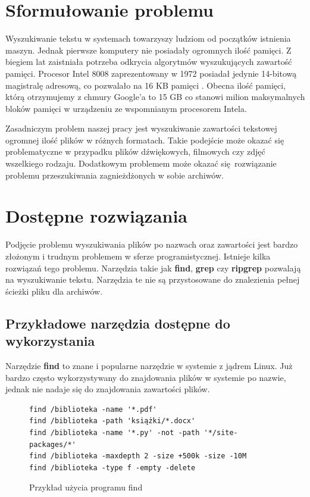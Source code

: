 \section{Sformułowanie problemu}
Wyszukiwanie tekstu w systemach towarzyszy ludziom od początków istnienia maszyn.
Jednak pierwsze komputery nie posiadały ogromnych ilość pamięci. Z biegiem lat
zaistniała potrzeba odkrycia algorytmów wyszukujących zawartość pamięci. 
Procesor Intel 8008 zaprezentowany w 1972 posiadał jedynie 14-bitową magistralę
adresową, co pozwalało na 16 KB pamięci \cite{bib:internet:Intel8008}. 
Obecna ilość pamięci, którą otrzymujemy z chmury Google'a to 15 GB
\cite{bib:internet:GoogleCloud} co stanowi milion maksymalnych bloków pamięci w 
urządzeniu ze wspomnianym procesorem Intela.

Zasadniczym problem naszej pracy jest wyszukiwanie zawartości tekstowej
ogromnej ilość plików w różnych formatach. Takie podejście może okazać się 
problematyczne \newline w przypadku plików dźwiękowych, filmowych czy zdjęć
wszelkiego rodzaju. Dodatkowym problemem może okazać się rozwiązanie problemu
przeszukiwania zagnieżdżonych w sobie archiwów.

\section{Dostępne rozwiązania} %

Podjęcie problemu wyszukiwania plików po nazwach oraz zawartości jest bardzo
złożonym i trudnym problemem w sferze programistycznej. Istnieje kilka rozwiązań
tego problemu. Narzędzia takie jak \textbf{find}, \textbf{grep} czy \textbf{ripgrep} 
\cite{bib:internet:ripgrep} pozwalają na wyszukiwanie tekstu. Narzędzia te nie 
są przystosowane do znalezienia pełnej ścieżki pliku dla archiwów.

\subsection{Przykładowe narzędzia dostępne do wykorzystania}

Narzędzie \textbf{find} to znane i popularne narzędzie w systemie z jądrem Linux.
Już bardzo często wykorzystywany do znajdowania plików w systemie po nazwie, 
jednak nie nadaje się do znajdowania zawartości plików.

\begin{figure}[h]
  \centering
\begin{tcolorbox}[
    colback=white,
    colframe=black,
    boxrule=0.5pt,
    arc=0pt
]
  \begin{verbatim}
find /biblioteka -name '*.pdf'
find /biblioteka -path 'książki/*.docx' 
find /biblioteka -name '*.py' -not -path '*/site-packages/*'  
find /biblioteka -maxdepth 2 -size +500k -size -10M           
find /biblioteka -type f -empty -delete 
  \end{verbatim}
\end{tcolorbox}
\caption{Przykład użycia programu find}
\label{fig:cmd:findExamples}
\end{figure}

